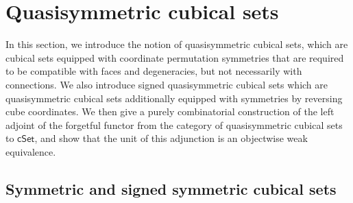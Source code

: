 \documentclass[oneside, 12pt]{amsart}
\numberwithin{equation}{section}
\theoremstyle{plain}
\theoremstyle{definition}
\theoremstyle{remark}
\newcommand{\cSet}{\mathsf{cSet}}
\begin{document}
	
	
	
	
	
	
	
	\section{Quasisymmetric cubical sets}\label{Quasisymmetric cubical sets}
	
	In this section, we introduce the notion of quasisymmetric cubical sets, which are cubical sets equipped with coordinate permutation symmetries that are required to be compatible with faces and degeneracies, but not necessarily with connections. We also introduce signed quasisymmetric cubical sets which are quasisymmetric cubical sets additionally equipped with symmetries by reversing cube coordinates. We then give a purely combinatorial construction of the left adjoint of the forgetful functor from the category of quasisymmetric cubical sets to $\cSet$, and show that the unit of this adjunction is an objectwise weak equivalence.
	
	
	\subsection{Symmetric and signed symmetric cubical sets}
	
\end{document}
